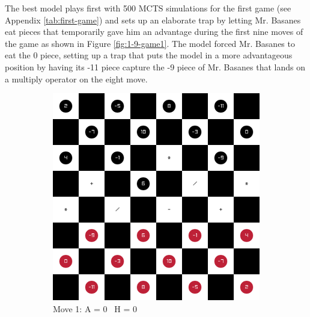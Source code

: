 
The best model plays first with 500 MCTS simulations for the first game (see Appendix \ref{tab:first-game}) and sets up an elaborate trap by letting Mr. Basanes eat pieces that temporarily gave him an advantage during the first nine moves of the game as shown in Figure \ref{fig:1-9-game1}. The model forced Mr. Basanes to eat the 0 piece, setting up a trap that puts the model in a more advantageous position by having its -11 piece capture the -9 piece of Mr. Basanes that lands on a multiply operator on the eight move.

\begin{figure}[H]
    \centering
    \begin{subfigure}{0.3\textwidth}
        \centering
        \includegraphics[width=\textwidth]{images/games/game1/move_2.png}
        \caption*{Move 1: A = 0 \textbar\ H = 0}
    \end{subfigure}
    \quad
    \begin{subfigure}{0.3\textwidth}
        \centering

\end{subfigure}
\end{figure}
